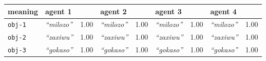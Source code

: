 
{\footnotesize\renewcommand{\arraystretch}{1.5}
\begin{tabular}{@{}p{1.2cm}|p{1.6cm}@{}p{0.8cm}@{}|p{1.6cm}@{}p{0.8cm}@{}|p{1.6cm}@{}p{0.8cm}@{}|p{1.6cm}@{}p{0.8cm}@{}}
meaning & agent 1 &  & agent 2 &  & agent 3 &  & agent 4 & \\
\hline
\texttt{obj-1}&\textit{``milozo''}
&1.00&\textit{``milozo''}
&1.00&\textit{``milozo''}
&1.00&\textit{``milozo''}
&1.00\\
\hline
\texttt{obj-2}&\textit{``zaxiwu''}
&1.00&\textit{``zaxiwu''}
&1.00&\textit{``zaxiwu''}
&1.00&\textit{``zaxiwu''}
&1.00\\
\hline
\texttt{obj-3}&\textit{``gokaso''}
&1.00&\textit{``gokaso''}
&1.00&\textit{``gokaso''}
&1.00&\textit{``gokaso''}
&1.00
\end{tabular}}
